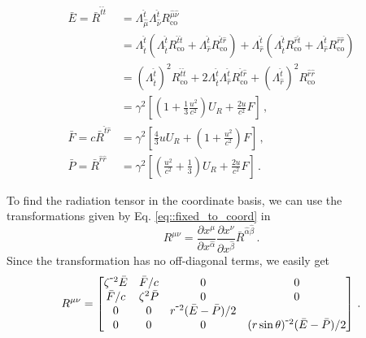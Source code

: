 \documentclass[../main.tex]{subfiles}
\begin{document}
\begin{align}
    \bar{E}=\bar{R}^{\hat{t}\hat{t}}&=\Lambda^{\hat{t}}_{\hat{\mu}}\Lambda^{\hat{t}}_{\hat{\nu}}R^{\hat{\mu}\hat{\nu}}_\text{co}\nonumber\\
    &=\Lambda^{\hat{t}}_{\hat{t}}(\Lambda^{\hat{t}}_{\hat{t}}R^{\hat{t}\hat{t}}_\text{co}+\Lambda^{\hat{t}}_{\hat{r}}R^{\hat{t}\hat{r}}_\text{co})+\Lambda^{\hat{t}}_{\hat{r}}(\Lambda^{\hat{t}}_{\hat{t}}R^{\hat{r}\hat{t}}_\text{co}+\Lambda^{\hat{t}}_{\hat{r}}R^{\hat{r}\hat{r}}_\text{co})\nonumber\\
    &=(\Lambda^{\hat{t}}_{\hat{t}})^2R^{\hat{t}\hat{t}}_\text{co}+2\Lambda^{\hat{t}}_{\hat{t}}\Lambda^{\hat{t}}_{\hat{r}}R^{\hat{t}\hat{r}}_\text{co}+(\Lambda^{\hat{t}}_{\hat{r}})^2R^{\hat{r}\hat{r}}_\text{co}\nonumber\\
    &=\gamma^2\left[\left(1+\frac{1}{3}\frac{u^2}{c^2}\right)U_R + \frac{2u}{c^2}F\right]\,,
\\
    \bar{F}=c\bar{R}^{\hat{t}\hat{r}}&=\gamma^2\left[\frac{4}{3}uU_R + \left(1+\frac{u^2}{c^2}\right)F\right]\,,\\
    \bar{P}=\bar{R}^{\hat{r}\hat{r}}&=\gamma^2\left[\left(\frac{u^2}{c^2}+\frac{1}{3}\right)U_R + \frac{2u}{c^2}F\right]\,.
\end{align}
\endgroup

To find the radiation tensor in the coordinate basis, we can use the transformations given by Eq. \eqref{eq::fixed_to_coord} in
\begin{equation}
    R^{\mu\nu}=\frac{\partial x^\mu}{\partial x^{\hat{\alpha}}}\frac{\partial x^\nu}{\partial x^{\hat{\beta}}}\bar{R}^{\hat{\alpha}\hat{\beta}}\,.
\end{equation}
Since the transformation has no off-diagonal terms, we easily get
\begin{equation}
R^{\mu\nu}=\begin{bmatrix}\zeta^{\-2}\bar{E}&\bar{F}/c&0&0\\\bar{F}/c&\zeta^2\bar{P}&0&0\\0&0&r^{\-2}(\bar{E}-\bar{P})/2\\0&0&0&(r\sin\theta)^{\-2}(\bar{E}-\bar{P})/2\end{bmatrix}\,.
\end{equation}
\end{document}
